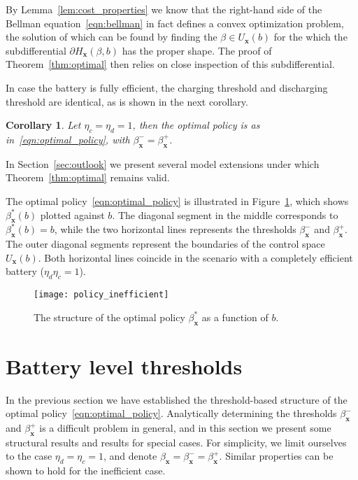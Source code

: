 \documentclass[journal]{IEEEtran}
\newcommand{\bfx}{\boldsymbol x}
\newcommand\1{\mathbf{1}}
\newtheorem{corollary}{Corollary}
\begin{document}
By Lemma~\ref{lem:cost_properties} we know that the right-hand side of the Bellman equation~\eqref{eqn:bellman} in fact defines a convex optimization problem, the solution of which can be found by finding the $\beta \in U_{\bfx}(b)$ for the which the subdifferential $\partial H_{\bfx}(\beta,b)$ has the proper shape. The proof of Theorem~\ref{thm:optimal} then relies on close inspection of this subdifferential.

In case the battery is fully efficient, the charging threshold and discharging threshold are identical, as is shown in the next corollary.

\begin{corollary}\label{col:efficient}
Let $\eta_c = \eta_d = 1$, then the optimal policy is as in~\eqref{eqn:optimal_policy}, with $\beta_{\bfx}^- = \beta_{\bfx}^+$.
\end{corollary}

In Section~\ref{sec:outlook} we present several model extensions under which Theorem~\ref{thm:optimal} remains valid.


The optimal policy~\eqref{eqn:optimal_policy} is illustrated in Figure~\ref{fig:policy}, which shows $\beta_{\bfx}^*(b)$ plotted against $b$. The diagonal segment in the middle corresponds to $\beta_{\bfx}^*(b) = b$, while the two horizontal lines represents the thresholds $\beta_{\bfx}^-$ and $\beta_{\bfx}^+$. The outer diagonal segments represent the boundaries of the control space $U_{\bfx}(b)$. Both horizontal lines coincide in the scenario with a completely efficient battery ($\eta_d \eta_c = 1$).

\begin{figure}[h]
    \begin{center}
        \texttt{[image: policy\_inefficient]}
    \end{center}
    \caption{The structure of the optimal policy $\beta_{\bfx}^*$ as a function of $b$.}
    \label{fig:policy}
\end{figure}



\section{Battery level thresholds}\label{sec:thresholds}

In the previous section we have established the threshold-based structure of the optimal policy~\eqref{eqn:optimal_policy}. Analytically determining the thresholds $\beta_{\bfx}^-$ and $\beta_{\bfx}^+$ is a difficult problem in general, and in this section we present some structural results and results for special cases. For simplicity, we limit ourselves to the case $\eta_d = \eta_c = 1$, and denote $\beta_{\bfx} = \beta_{\bfx}^- = \beta_{\bfx}^+$. Similar properties can be shown to hold for the inefficient case.
\end{document}
